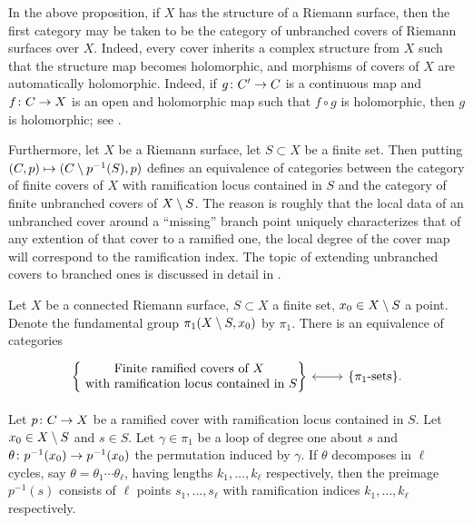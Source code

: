 \begin{rmk} \label{pr:extending-covers}
 In the above proposition, if $X$ has the structure of a Riemann surface, then the first category may be taken to be the category of unbranched covers of Riemann surfaces over $X$. Indeed, every cover inherits a complex structure from $X$ such that the structure map becomes holomorphic, and morphisms of covers of $X$ are automatically holomorphic. Indeed, if $g\colon C'\to C$ is a continuous map and $f\colon C\to X$ is an open and holomorphic map such that $f\circ g$ is holomorphic, then $g$ is holomorphic; see \cite[1.3.7]{Lamotke2005}.
 
 Furthermore, let $X$ be a Riemann surface, let $S\subset X$ be a finite set. Then putting $(C,p)\mapsto (C\setminus p^{-1}(S),p)$ defines an equivalence of categories between the category of finite covers of $X$ with ramification locus contained in $S$ and the category of finite unbranched covers of $X\setminus S$. The reason is roughly that the local data of an unbranched cover around a ``missing'' branch point uniquely characterizes that of any extention of that cover to a ramified one, \eg the local degree of the cover map will correspond to the ramification index. The topic of extending unbranched covers to branched ones is discussed in detail in \cite[4.6]{Lamotke2005}.
\end{rmk}

\begin{cor} \label{pr:eq-of-cats}
 Let $X$ be a connected Riemann surface, $S\subset X$ a finite set, $x_0\in X\setminus S$ a point. Denote the fundamental group $\pi_1(X\setminus S,x_0)$ by $\pi_1$. There is an equivalence of categories
 \[
  \begin{tikzcd}
   \begin{Bmatrix}\text{Finite ramified covers of }X\\\text{ with ramification locus contained in $S$}\end{Bmatrix} \arrow[<->]{r} & \{\pi_1\text{-sets}\}.
  \end{tikzcd}
 \]
\end{cor}

\begin{rmk} \label{pr:branching-and-actions}
Let $p\colon C\to X$ be a ramified cover with ramification locus contained in $S$. Let $x_0\in X\setminus S$ and $s\in S$. Let $\gamma\in\pi_1$ be a loop of degree one about $s$ and $\theta\colon p^{-1}(x_0)\to p^{-1}(x_0)$ the permutation induced by $\gamma$. If $\theta$ decomposes in $\ell$ cycles, say $\theta = \theta_1\dotsm\theta_\ell$, having lengths $k_1,\dotsc,k_\ell$ respectively, then the preimage $p^{-1}(s)$ consists of $\ell$ points $s_1,\dotsc,s_\ell$ with ramification indices $k_1,\dotsc,k_\ell$ respectively.
\end{rmk}


